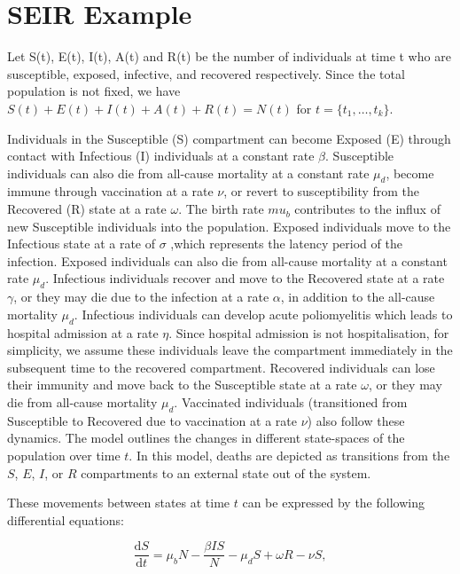 \documentclass{article}
\newcommand{\diff}{\mathrm{d}}
\begin{document}
\printbibliography

\newpage
\appendix
\setcounter{table}{0}
\renewcommand{\thetable}{A\arabic{table}}
\section{SEIR Example}
\label{app:seir-details}

Let S(t), E(t), I(t), A(t) and R(t) be the number of individuals at time t who are susceptible, exposed, infective, and recovered respectively. Since the total population is not fixed, we have \( S(t) + E(t) + I(t) + A(t)+ R(t) = N(t) \) for \( t = \{t_1, \ldots, t_k\} \). 

Individuals in the Susceptible (S) compartment can become Exposed (E) through contact with Infectious (I) individuals at a constant rate $\beta$. Susceptible individuals can also die from all-cause mortality at a constant rate $\mu_d$, become immune through vaccination at a rate $\nu$, or revert to susceptibility from the Recovered (R) state at a rate 
$\omega$. The birth rate $mu_b$ contributes to the influx of new Susceptible individuals into the population. Exposed individuals move to the Infectious state at a rate of $\sigma$ ,which represents the latency period of the infection. Exposed individuals can also die from all-cause mortality at a constant rate $\mu_d$. Infectious individuals recover and move to the Recovered state at a rate $\gamma$, or they may die due to the infection at a rate $\alpha$, in addition to the all-cause mortality $\mu_d$. Infectious individuals can develop acute poliomyelitis which leads to hospital admission at a rate $\eta$. Since hospital admission is not hospitalisation, for simplicity, we assume these individuals leave the compartment immediately in the subsequent time to the recovered compartment.
Recovered individuals can lose their immunity and move back to the Susceptible state at a rate $\omega$, or they may die from all-cause mortality $\mu_d$. Vaccinated individuals (transitioned from Susceptible to Recovered due to vaccination at a rate $\nu$) also follow these dynamics. The model outlines the changes in different state-spaces of the population over time \( t \). In this model, deaths are  depicted as transitions from the \( S \), \( E \), \( I \), or \( R \) compartments to an external state out of the system. 

These movements between states at time $t$ can be expressed by the following differential equations:

\begin{equation}
    \frac{\diff S}{\diff t} = \mu_b N - \frac{\beta I S}{N} - \mu_d S + \omega R  - \nu S,
    \label{eq:ODE1}
\end{equation}
\end{document}
